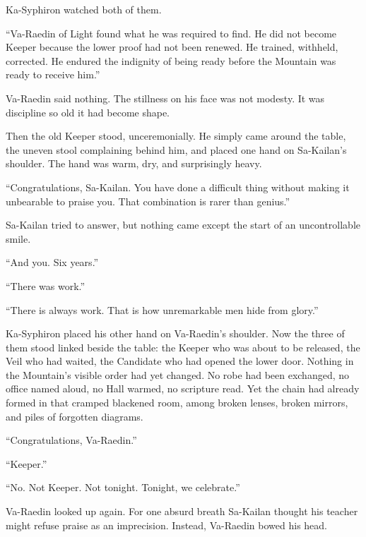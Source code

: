Ka-Syphiron watched both of them.\par

“Va-Raedin of Light found what he was required to find.
He did not become Keeper because the lower proof had not been renewed.
He trained, withheld, corrected.
He endured the indignity of being ready before the Mountain was ready to receive him.”\par

Va-Raedin said nothing.
The stillness on his face was not modesty.
It was discipline so old it had become shape.\par




Then the old Keeper stood, unceremonially.
He simply came around the table, the uneven stool complaining behind him, and placed one hand on Sa-Kailan’s shoulder.
The hand was warm, dry, and surprisingly heavy.\par

“Congratulations, Sa-Kailan.
You have done a difficult thing without making it unbearable to praise you.
That combination is rarer than genius.”\par

Sa-Kailan tried to answer, but nothing came except the start of an uncontrollable smile.\par

“And you.
Six years.”\par
“There was work.”\par
“There is always work.
That is how unremarkable men hide from glory.”\par

Ka-Syphiron placed his other hand on Va-Raedin’s shoulder.
Now the three of them stood linked beside the table: the Keeper who was about to be released, the Veil who had waited, the Candidate who had opened the lower door.
Nothing in the Mountain’s visible order had yet changed.
No robe had been exchanged, no office named aloud, no Hall warmed, no scripture read.
Yet the chain had already formed in that cramped blackened room, among broken lenses, broken mirrors, and piles of forgotten diagrams.\par

“Congratulations, Va-Raedin.”\par
“Keeper.”\par
“No.
Not Keeper.
Not tonight.
Tonight, we celebrate.”\par

Va-Raedin looked up again.
For one absurd breath Sa-Kailan thought his teacher might refuse praise as an imprecision.
Instead, Va-Raedin bowed his head.\par

